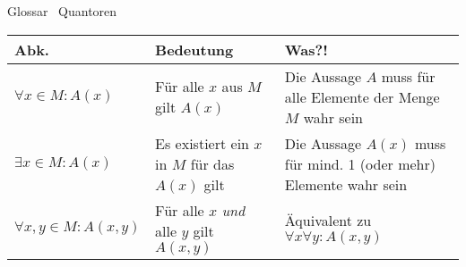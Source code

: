 \begin{frame}[fragile]{Glossar \textemdash\ Quantoren}
    \small
    \begin{tabular}{p{} p{} p{}}
        \toprule
        Abk.                         & Bedeutung                                        & Was?!                                                              \\
        \midrule
        $\forall x \in M : A(x)$     & Für alle $x$ aus $M$ gilt $A(x)$                 & Die Aussage $A$ muss für alle Elemente der Menge $M$ wahr sein     \\
        $\exists x \in M : A(x)$     & Es existiert ein $x$ in $M$ für das $A(x)$ gilt  & Die Aussage $A(x)$ muss für mind. 1 (oder mehr) Elemente wahr sein \\
        $\forall x,y \in M : A(x,y)$ & Für alle $x$ \textit{und} alle $y$ gilt $A(x,y)$ & Äquivalent zu $\forall x \forall y : A(x,y)$                       \\
        \bottomrule
    \end{tabular}
\end{frame}